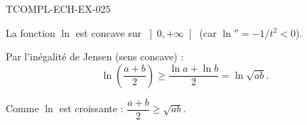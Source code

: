 \begin{corrige}{TCOMPL-ECH-EX-025}

La fonction $\ln$ est concave sur $\left]0, +\infty\right[$ (car $\ln'' = -1/t^2 < 0$).


Par l'inégalité de Jensen (sens concave) :
\[ \ln\!\left(\frac{a+b}{2}\right) \geq \frac{\ln a + \ln b}{2} = \ln\sqrt{ab}. \]

Comme $\ln$ est croissante : $\dfrac{a+b}{2} \geq \sqrt{ab}$.

\end{corrige}
